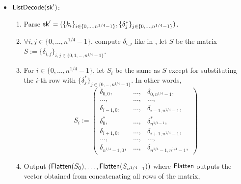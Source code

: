 \begin{itemize}[leftmargin=5mm,itemsep=1pt]
\item 
 ${\sf ListDecode}(\mathsf{sk}')$:
\begin{enumerate}[leftmargin=5mm,itemsep=1pt]
\item 
Parse $\mathsf{sk}' = (\{k_i\}_{i\in \{0, \ldots, n^{1/4}-1\}}, 
\{\delta^*_j\}_{j\in \{0, \ldots, n^{1/4}-1\}})$.
\item 
$\forall i, j  \in \{0, \ldots, n^{1/4}-1\}$, 
compute $\delta_{i, j}$
like in , let 
$S$ be the matrix $S := \{\delta_{i, j}\}_{i, j 
\in \{0,1, \ldots, n^{1/4}-1\}}$.
\item 
For $i \in \{0, \ldots, n^{1/4}-1\}$, 
let $S_i$ be the same as
$S$ except for substituting the $i$-th row 
with  
$\{\delta^*_j\}_{j\in \{0, \ldots, n^{1/4}-1\}}$.
In other words, 
\[
S_i := \left(
\begin{array}{lcr}
\delta_{0, 0}, &  \ldots, & \delta_{0, n^{1/4}-1}, \\
\ldots, & \ldots, & \ldots, \\ 
\delta_{i-1, 0}, & \ldots, &\delta_{i-1,  n^{1/4}-1}, \\
\delta^*_0, &\ldots, &\delta^*_{n^{1/4-1}}, \\
\delta_{i+1, 0}, & \ldots, &\delta_{i+1,  n^{1/4}-1}, \\
\ldots, & \ldots, & \ldots, \\ 
\delta_{n^{1/4} -1, 0}, &  \ldots, &\delta_{n^{1/4}-1, n^{1/4}-1}, 
\end{array}
\right)
\]
\item 
{}
Output $({\sf Flatten}(S_0), \ldots, {\sf Flatten}(S_{n^{1/4}-1}))$
where ${\sf Flatten}$ outputs
the vector obtained from concatenating all rows of the matrix,


\end{enumerate}
\end{itemize}

